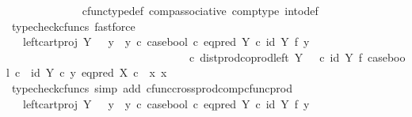 \begin{isabellebody}
\ \ \ \ \ \ \ \ \ \ \ \ \isamarkupfalse%
\ cfunc{\isacharunderscore}{\kern0pt}type{\isacharunderscore}{\kern0pt}def\ comp{\isacharunderscore}{\kern0pt}associative\ comp{\isacharunderscore}{\kern0pt}type\ into{\isacharunderscore}{\kern0pt}def\ \isamarkupfalse%
\ {\isacharparenleft}{\kern0pt}typecheck{\isacharunderscore}{\kern0pt}cfuncs{\isacharcomma}{\kern0pt}\ fastforce{\isacharparenright}{\kern0pt}\isanewline
\ \ \ \ \ \ \ \ \ \ \isamarkupfalse%
\ \isamarkupfalse%
\ {\isachardoublequoteopen}{\isachardot}{\kern0pt}{\isachardot}{\kern0pt}{\isachardot}{\kern0pt}\ {\isacharequal}{\kern0pt}\ {\isacharparenleft}{\kern0pt}left{\isacharunderscore}{\kern0pt}cart{\isacharunderscore}{\kern0pt}proj\ Y\ {\isasymone}\ {\isasymamalg}\ {\isacharparenleft}{\kern0pt}{\isacharparenleft}{\kern0pt}y{}\ {\isasymamalg}\ y{}{\isacharparenright}{\kern0pt}\ {\isasymcirc}\isactrlsub c\ case{\isacharunderscore}{\kern0pt}bool\ {\isasymcirc}\isactrlsub c\ eq{\isacharunderscore}{\kern0pt}pred\ Y\ {\isasymcirc}\isactrlsub c\ {\isacharparenleft}{\kern0pt}id\ Y\ {\isasymtimes}\isactrlsub f\ y{}{\isacharparenright}{\kern0pt}{\isacharparenright}{\kern0pt}{\isacharparenright}{\kern0pt}\isanewline
\ \ \ \ \ \ \ \ \ \ \ \ \ \ \ \ \ \ \ \ \ \ \ \ \ \ \ \ \ \ \ \ \ {\isasymcirc}\isactrlsub c\ dist{\isacharunderscore}{\kern0pt}prod{\isacharunderscore}{\kern0pt}coprod{\isacharunderscore}{\kern0pt}left\ Y\ {\isasymone}\ {\isasymone}\ {\isasymcirc}\isactrlsub c\ {\isacharparenleft}{\kern0pt}id\ Y\ {\isasymtimes}\isactrlsub f\ case{\isacharunderscore}{\kern0pt}bool{\isacharparenright}{\kern0pt}\ {\isasymcirc}\isactrlsub c\ \ {\isasymlangle}id\ Y\ {\isasymcirc}\isactrlsub c\ y{\isacharcomma}{\kern0pt}\ eq{\isacharunderscore}{\kern0pt}pred\ X\ {\isasymcirc}\isactrlsub c\ \ {\isasymlangle}x{\isacharcomma}{\kern0pt}\ x{\isasymrangle}{\isasymrangle}{\isachardoublequoteclose}\isanewline
\ \ \ \ \ \ \ \ \ \ \ \ \isamarkupfalse%
\ {\isacharparenleft}{\kern0pt}typecheck{\isacharunderscore}{\kern0pt}cfuncs{\isacharcomma}{\kern0pt}\ simp\ add{\isacharcolon}{\kern0pt}\ cfunc{\isacharunderscore}{\kern0pt}cross{\isacharunderscore}{\kern0pt}prod{\isacharunderscore}{\kern0pt}comp{\isacharunderscore}{\kern0pt}cfunc{\isacharunderscore}{\kern0pt}prod{\isacharparenright}{\kern0pt}\isanewline
\ \ \ \ \ \ \ \ \ \isamarkupfalse%
\ \isamarkupfalse%
\ {\isachardoublequoteopen}{\isachardot}{\kern0pt}{\isachardot}{\kern0pt}{\isachardot}{\kern0pt}\ {\isacharequal}{\kern0pt}\ {\isacharparenleft}{\kern0pt}left{\isacharunderscore}{\kern0pt}cart{\isacharunderscore}{\kern0pt}proj\ Y\ {\isasymone}\ {\isasymamalg}\ {\isacharparenleft}{\kern0pt}{\isacharparenleft}{\kern0pt}y{}\ {\isasymamalg}\ y{}{\isacharparenright}{\kern0pt}\ {\isasymcirc}\isactrlsub c\ case{\isacharunderscore}{\kern0pt}bool\ {\isasymcirc}\isactrlsub c\ eq{\isacharunderscore}{\kern0pt}pred\ Y\ {\isasymcirc}\isactrlsub c\ {\isacharparenleft}{\kern0pt}id\ Y\ {\isasymtimes}\isactrlsub f\ y{}{\isacharparenright}{\kern0pt}{\isacharparenright}{\kern0pt}{\isacharparenright}{\kern0pt}\ \isanewline

\end{isabellebody}
